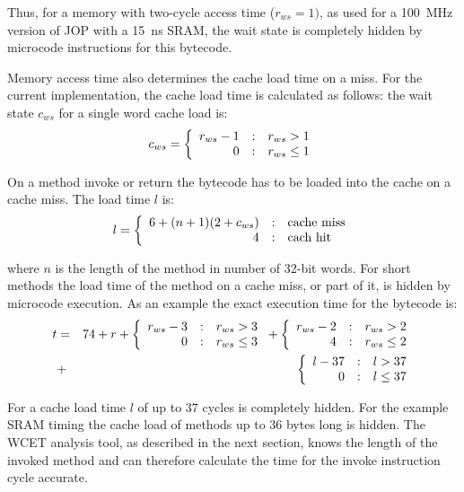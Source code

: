 Thus, for a memory with two-cycle access time ($r_{ws}=1)$, as used
for a 100~MHz version of JOP with a 15~ns SRAM, the wait state is
completely hidden by microcode instructions for this bytecode.

Memory access time also determines the cache load time on a miss. For
the current implementation, the cache load time is calculated as
follows: the wait state $c_{ws}$ for a single word cache load is:
%
{\small
\begin{equation*}
    c_{ws} =
    \left\{\begin{array}{r@{\quad:\quad}l}
    r_{ws}-1 & r_{ws}>1 \\
    0   & r_{ws}\le1
    \end{array} \right.
\end{equation*}
}

On a method invoke or return the bytecode has to be loaded into the
cache on a cache miss. The load time $l$ is:
%
{\small
\[
    l =
    \left\{\begin{array}{r@{\quad:\quad}l}
    6+(n+1)(2+c_{ws}) & \mbox{cache miss} \\
    4   & \mbox{cach hit}
    \end{array} \right.
\]
}

where $n$ is the length of the method in number of 32-bit words. For
short methods the load time of the method on a cache miss, or part
of it, is hidden by microcode execution. As an example the exact
execution time for the bytecode  is:
%
{\small
\begin{eqnarray}
\nonumber
    t &=& 74+r+
    \left\{\begin{array}{r@{\quad:\quad}l}
    r_{ws}-3 & r_{ws}>3 \\
    0   & r_{ws}\le3
    \end{array} \right.
    +
    \left\{\begin{array}{r@{\quad:\quad}l}
    r_{ws}-2 & r_{ws}>2 \\
    4   & r_{ws}\le2
    \end{array} \right.\\
\nonumber
    &+&
    \left\{\begin{array}{r@{\quad:\quad}l}
    l-37 & l>37 \\
    0   & l\le37
    \end{array} \right.
\end{eqnarray}
}

For  a cache load time $l$ of up to 37 cycles is
completely hidden. For the example SRAM timing the cache load of
methods up to 36 bytes long is hidden. The WCET analysis tool, as
described in the next section, knows the length of the invoked
method and can therefore calculate the time for the invoke
instruction cycle accurate.




